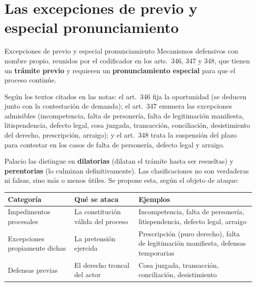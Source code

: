 \documentclass[12pt,oneside]{book}
\renewcommand{\arraystretch}{1.15}
\begin{document}
\section{Las excepciones de previo y especial pronunciamiento}

\begin{definicion}{Excepciones de previo y especial pronunciamiento}
Mecanismos defensivos con nombre propio, reunidos por el codificador en los arts.~346, 347 y 348, que tienen un \textbf{trámite previo} y requieren un \textbf{pronunciamiento especial} para que el proceso continúe.
\end{definicion}

Según los textos citados en las notas: el art.~346 fija la oportunidad (se deducen junto con la contestación de demanda); el art.~347 enumera las excepciones admisibles (incompetencia, falta de personería, falta de legitimación manifiesta, litispendencia, defecto legal, cosa juzgada, transacción, conciliación, desistimiento del derecho, prescripción, arraigo); y el art.~348 trata la suspensión del plazo para contestar en los casos de falta de personería, defecto legal y arraigo. %

Palacio las distingue en \textbf{dilatorias} (dilatan el trámite hasta ser resueltas) y \textbf{perentorias} (lo culminan definitivamente). Las clasificaciones no son verdaderas ni falsas, sino más o menos útiles. Se propone esta, según el objeto de ataque:

\begin{table}[H]
\centering
\renewcommand{\arraystretch}{1.25}
\begin{tabularx}{\textwidth}{>{\RaggedRight\arraybackslash}p{}>{\RaggedRight\arraybackslash}p{}>{\RaggedRight\arraybackslash}X}
\toprule
\textbf{Categoría} & \textbf{Qué se ataca} & \textbf{Ejemplos} \\
\midrule
Impedimentos procesales & La constitución válida del proceso & Incompetencia, falta de personería, litispendencia, defecto legal, arraigo \\
Excepciones propiamente dichas & La pretensión ejercida & Prescripción (puro derecho), falta de legitimación manifiesta, defensas temporarias \\
Defensas previas & El derecho troncal del actor & Cosa juzgada, transacción, conciliación, desistimiento \\
\bottomrule
\end{tabularx}
\end{table}
\end{document}
